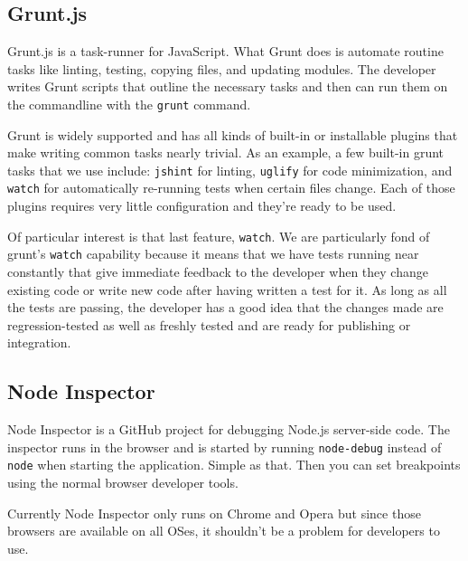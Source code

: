 \documentclass[12pt]{ucthesis}
\begin{document}
\subsection{Grunt.js}
Grunt.js\cite{GruntJS} is a task-runner for JavaScript. What Grunt does is automate routine tasks like linting, testing, copying files, and updating modules. The developer writes Grunt scripts that outline the necessary tasks and then can run them on the commandline with the \lstinline{grunt} command.

Grunt is widely supported and has all kinds of built-in or installable plugins that make writing common tasks nearly trivial. As an example, a few built-in grunt tasks that we use include: \lstinline{jshint} for linting, \lstinline{uglify} for code minimization, and \lstinline{watch} for automatically re-running tests when certain files change. Each of those plugins requires very little configuration and they're ready to be used.

Of particular interest is that last feature, \lstinline{watch}. We are particularly fond of grunt's \lstinline{watch} capability because it means that we have tests running near constantly that give immediate feedback to the developer when they change existing code or write new code after having written a test for it. As long as all the tests are passing, the developer has a good idea that the changes made are regression-tested as well as freshly tested and are ready for publishing or integration.

\subsection{Node Inspector}
Node Inspector\cite{NodeInspector} is a GitHub project for debugging Node.js server-side code. The inspector runs in the browser and is started by running \lstinline{node-debug} instead of \lstinline{node} when starting the application. Simple as that. Then you can set breakpoints using the normal browser developer tools.

Currently Node Inspector only runs on Chrome and Opera but since those browsers are available on all OSes, it shouldn't be a problem for developers to use.
\end{document}
